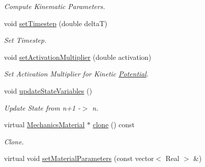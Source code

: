\begin{DoxyCompactItemize}
\begin{DoxyCompactList}\small\item\em Compute Kinematic Parameters. \item\end{DoxyCompactList}\item 
\hypertarget{classvoom_1_1_plastic_material_ab8352c88bb9d004fed0d56dcab8cbe81}{
void \hyperlink{classvoom_1_1_plastic_material_ab8352c88bb9d004fed0d56dcab8cbe81}{setTimestep} (double deltaT)}
\label{classvoom_1_1_plastic_material_ab8352c88bb9d004fed0d56dcab8cbe81}

\begin{DoxyCompactList}\small\item\em Set Timestep. \item\end{DoxyCompactList}\item 
\hypertarget{classvoom_1_1_plastic_material_a14d8dab44995db7899769b582d0e7cc6}{
void \hyperlink{classvoom_1_1_plastic_material_a14d8dab44995db7899769b582d0e7cc6}{setActivationMultiplier} (double activation)}
\label{classvoom_1_1_plastic_material_a14d8dab44995db7899769b582d0e7cc6}

\begin{DoxyCompactList}\small\item\em Set Activation Multiplier for Kinetic \hyperlink{classvoom_1_1_potential}{Potential}. \item\end{DoxyCompactList}\item 
\hypertarget{classvoom_1_1_plastic_material_a3cdf4c723b3b7ef40efaa593166042e9}{
void \hyperlink{classvoom_1_1_plastic_material_a3cdf4c723b3b7ef40efaa593166042e9}{updateStateVariables} ()}
\label{classvoom_1_1_plastic_material_a3cdf4c723b3b7ef40efaa593166042e9}

\begin{DoxyCompactList}\small\item\em Update State from n+1 -\/$>$ n. \item\end{DoxyCompactList}\item 
\hypertarget{classvoom_1_1_plastic_material_a60d026dd249bc8161a903d5fbb10f293}{
virtual \hyperlink{classvoom_1_1_mechanics_material}{MechanicsMaterial} $\ast$ \hyperlink{classvoom_1_1_plastic_material_a60d026dd249bc8161a903d5fbb10f293}{clone} () const }
\label{classvoom_1_1_plastic_material_a60d026dd249bc8161a903d5fbb10f293}

\begin{DoxyCompactList}\small\item\em Clone. \item\end{DoxyCompactList}\item 
\hypertarget{classvoom_1_1_plastic_material_aaa65a7b7dc8aac8078ba6f4e18c2ded4}{
virtual void \hyperlink{classvoom_1_1_plastic_material_aaa65a7b7dc8aac8078ba6f4e18c2ded4}{setMaterialParameters} (const vector$<$ Real $>$ \&)}
\label{classvoom_1_1_plastic_material_aaa65a7b7dc8aac8078ba6f4e18c2ded4}


\end{DoxyCompactItemize}
